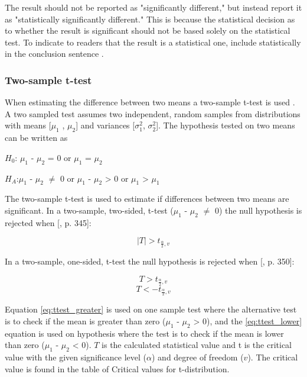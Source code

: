 The result should not be reported as "significantly different," but instead report it as "statistically significantly different." This is because the statistical decision as to whether the result is significant should not be based solely on the statistical test. To indicate to readers that the result is a statistical one, include statistically in the conclusion sentence \citep{LundResearchLtd2013a}. 

\subsubsection{Two-sample t-test}\label{sec:t-test}
When estimating the difference between two means a two-sample t-test is used \citep{Walpole2012}. A two sampled test assumes two independent, random samples from distributions with means [$\mu_{1}$ , $\mu_{2}$] and variances [$\sigma_{1}^{2}$, $\sigma_{2}^{2}$]. %
The hypothesis tested on two means can be written as\newline

\centerline{$H_{0}$: $\mu_{1}$ - $\mu_{2}$ = 0 or $\mu_{1}$ = $\mu_{2}$} 
\centerline{$H_{A}$:$\mu_{1}$ - $\mu_{2}$ $\neq$ 0 or $\mu_{1}$ - $\mu_{2}$ > 0 or $\mu_{1}$ > $\mu_{1}$}

The two-sample t-test is used to estimate if differences between two means are significant. In a two-sample, two-sided, t-test ($\mu_{1}$ - $\mu_{2}$ $\neq$ 0) the null hypothesis is rejected when [\citep{Walpole2012}, p. 345]:

\begin{equation}
\label{eq:ttest_twoway}
|T| > t_{\frac{\alpha}{2}, v} 
\end{equation}

In a two-sample, one-sided, t-test the null hypothesis is rejected when [\citep{Walpole2012}, p. 350]:

\begin{equation}
\label{eq:ttest_greater}
T > t_{\frac{\alpha}{2}, v}
\end{equation}
\begin{equation}
\label{eq:ttest_lower}
T < - t_{\frac{\alpha}{2}, v}
\end{equation}

Equation \ref{eq:ttest_greater} is used on one sample test where the alternative test is to check if the mean is greater than zero ($\mu_{1}$ - $\mu_{2}$ > 0), and the \ref{eq:ttest_lower} equation is used on hypothesis where the test is to check if the mean is lower than zero ($\mu_{1}$ - $\mu_{2}$ < 0). $T$ is the calculated statistical value and t is the critical value with the given significance level ($\alpha$) and degree of freedom ($v$). The critical value is found in the table of Critical values for t-distribution. \newline 
 
